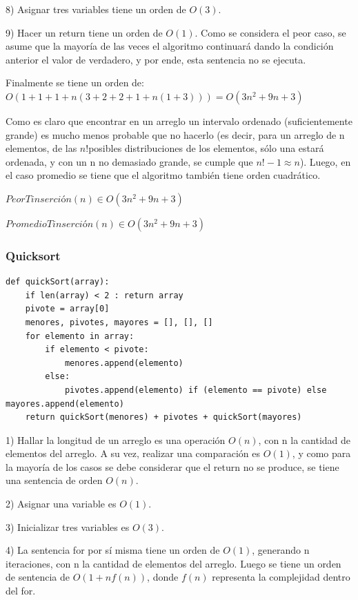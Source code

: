 \documentclass[article,a4paper]{article}
\begin{document}
8) Asignar tres variables tiene un orden de $O(3)$.
 
9) Hacer un return tiene un orden de $O(1)$. Como se considera el peor caso, se asume que la mayoría de las veces el algoritmo continuará dando la condición anterior el valor de verdadero, y por ende, esta sentencia no se ejecuta.

Finalmente se tiene un orden de:
$O( 1 + 1 + 1 + n(3 + 2 + 2 + 1 + n(1 + 3) ) ) = O( 3n^2 + 9n + 3)$

Como es claro que encontrar en un arreglo un intervalo ordenado (suficientemente grande) es mucho menos probable que no hacerlo (es decir, para un arreglo de n elementos, de las $n!$posibles distribuciones de los elementos, sólo una estará ordenada, y con un n no demasiado grande, se cumple que $n!-1 \approx n$). Luego, en el caso promedio se tiene que el algoritmo también tiene orden cuadrático.

$PeorTinserción(n) \in O(3n^2 + 9n + 3)$

$PromedioTinserción(n) \in O(3n^2 + 9n + 3) $

\subsubsection{Quicksort}
\begin{verbatim}
def quickSort(array):
    if len(array) < 2 : return array
    pivote = array[0]
    menores, pivotes, mayores = [], [], []
    for elemento in array:
        if elemento < pivote:
            menores.append(elemento)
        else:
            pivotes.append(elemento) if (elemento == pivote) else mayores.append(elemento)            
    return quickSort(menores) + pivotes + quickSort(mayores)
\end{verbatim}

1) Hallar la longitud de un arreglo es una operación $O(n)$, con n la cantidad de elementos del arreglo. A su vez, realizar una comparación es $O(1)$, y como para la mayoría de los casos se debe considerar que el return no se produce, se tiene una sentencia de orden $O(n)$. 

2) Asignar una variable es $O(1)$.

3) Inicializar tres variables es $O(3)$.

4) La sentencia for por sí misma tiene un orden de $O(1)$, generando n iteraciones, con n la cantidad de elementos del arreglo. Luego se tiene un orden de sentencia de $O(1 + nf(n))$, donde $f(n)$ representa la complejidad dentro del for.
\end{document}
